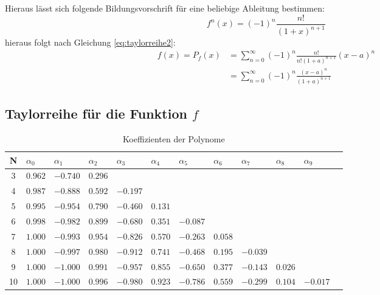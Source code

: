 \documentclass{beamer}
\begin{document}
  \begin{frame}
    Hieraus lässt sich folgende Bildungsvorschrift für eine beliebige Ableitung bestimmen:
    \begin{equation}
        f^n\left(x\right) = \left(-1\right)^n \frac{n!}{\left(1+x\right)^{n+1}}
    \end{equation}
    hieraus folgt nach Gleichung \ref{eq:taylorreihe2}:
    \begin{align}
        f\left(x\right)  =  P_f\left(x\right) 
                        &= \sum_{n=0}^{\infty} \left(-1\right)^n
                            \frac{n!}{n!\left(1+a\right)^{n+1}}\left(x-a\right)^n\\
                        &=  \sum_{n=0}^{\infty} \left(-1\right)^n
                            \frac{\left(x-a\right)^n}{\left(1+a\right)^{n+1}}
    \end{align}
  \end{frame}
    
  \subsection{Taylorreihe für die Funktion $f$}
  \begin{frame}
    \centering    
    \begin{table}[htbp]
    \tiny   
    \renewcommand{\arraystretch}{1.5}
    \begin{tabularx}{\textwidth}{|c|X|X|X|X|X|X|X|X|X|X|X|}
        \hline    
        N & $\alpha_0$&$\alpha_1$&$\alpha_2$&$\alpha_3$&$\alpha_4$&$\alpha_5$&$\alpha_6$&$\alpha_7$&$\alpha_8$&$\alpha_9$\\\hline
        3 & $0.962$ & $-0.740$ & $0.296$ &&&&&&& \\\hline
        4 & $0.987$ & $-0.888$ & $0.592$ & $-0.197$ &&&&&& \\\hline
        5 & $0.995$ & $-0.954$ & $0.790$ & $-0.460$ & $0.131$ &&&&& \\\hline
        6 & $0.998$ & $-0.982$ & $0.899$ & $-0.680$ & $0.351$ & $-0.087$ &&&& \\\hline
        7 & $1.000$ & $-0.993$ & $0.954$ & $-0.826$ & $0.570$ & $-0.263$ & $0.058$ &&& \\\hline
        8 & $1.000$ & $-0.997$ & $0.980$ & $-0.912$ & $0.741$ & $-0.468$ & $0.195$ & $-0.039$ && \\\hline
        9 & $1.000$ & $-1.000$ & $0.991$ & $-0.957$ & $0.855$ & $-0.650$ & $0.377$ & $-0.143$ & $0.026$ & \\\hline
        10& $1.000$ & $-1.000$ & $0.996$ & $-0.980$ & $0.923$ & $-0.786$ & $0.559$ & $-0.299$ & $0.104$ & $-0.017$ \\\hline
    \end{tabularx}
    \caption{Koeffizienten der Polynome}      
    \end{table}
  \end{frame}
  
\end{document}
